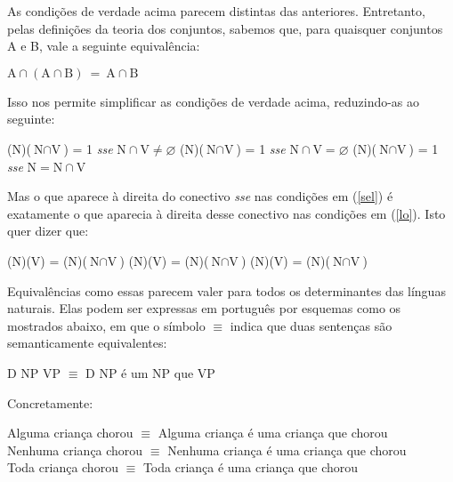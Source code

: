 \n As condições de verdade acima parecem distintas das anteriores.
Entretanto, pelas definições da teoria dos conjuntos, sabemos que, para quaisquer conjuntos A e B, vale a seguinte equivalência:

\begin{exe}
	\ex $\text{A}\cap (\text{A}\cap\text{B})\ =\ \text{A}\cap\text{B}$
\end{exe}

\n Isso nos permite simplificar as condições de verdade acima, reduzindo-as ao seguinte:


\begin{exe}
    \ex\label{sel}
    \begin{xlist}
        \ex  {}(N)($\text{N}\cap\text{V}$) = 1 \textit{sse}
            $\text{N}\cap\text{V}\neq\varnothing$\label{sela}
        \ex  {}(N)($\text{N}\cap\text{V}$) = 1 \textit{sse}
            $\text{N}\cap \text{V}=\varnothing$\label{selz}
        \ex  {}(N)($\text{N}\cap\text{V}$) = 1 \textit{sse}
            $\text{N}=\text{N}\cap\text{V}$\label{selc}
    \end{xlist}
\end{exe}

\n Mas o que aparece à direita do conectivo \textit{sse} nas
condições em (\ref{sel}) é exatamente o que aparecia à direita desse
conectivo nas condições em (\ref{lo}). Isto quer dizer que:


\begin{exe}
    \ex\label{ul}
    \begin{xlist}
        \ex  {}(N)(V) = (N)($\text{N}\cap\text{V}$)\label{ula}
        \ex  {}(N)(V) = (N)($\text{N}\cap\text{V}$)\label{ulz}
        \ex  {}(N)(V) = (N)($\text{N}\cap\text{V}$)\label{ulc}
    \end{xlist}
\end{exe}

\n Equivalências como essas parecem valer
para todos os determinantes das línguas naturais. Elas podem ser expressas em português por esquemas como os mostrados abaixo, em que o símbolo $\equiv$ indica que duas sentenças são semanticamente equivalentes:

\begin{exe}
	\ex D NP VP $\equiv$ D NP é um NP que VP
\end{exe}

\n Concretamente:

\begin{exe}
	\ex Alguma criança chorou $\equiv$ Alguma criança é uma criança que chorou\\
	Nenhuma criança chorou $\equiv$ Nenhuma criança é uma criança que chorou\\
	Toda criança chorou $\equiv$ Toda criança é uma criança que chorou
\end{exe}


